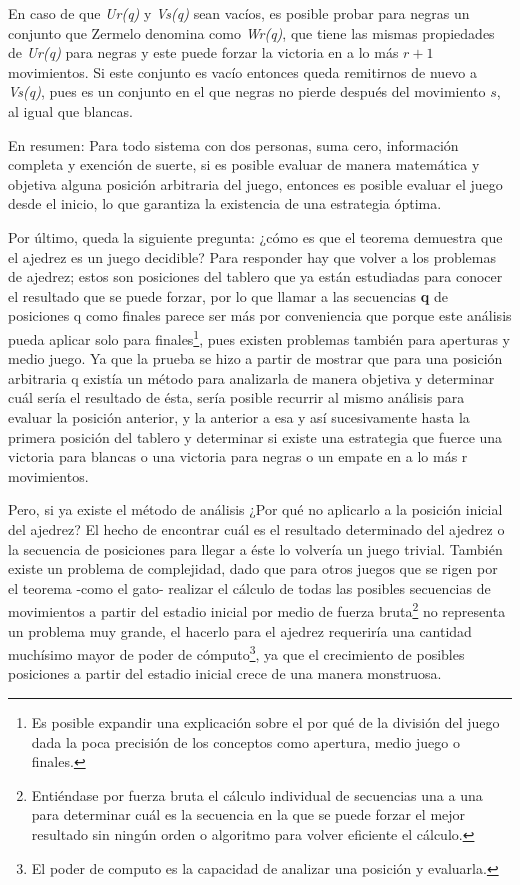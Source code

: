 \documentclass[twoside,openright,12pt,a4paper,spanish]{book}
\begin{document}
En caso de que \emph{Ur(q)} y \emph{Vs(q)} sean vacíos, es posible probar para negras un conjunto que Zermelo denomina como \emph{Wr(q)}, que tiene las mismas propiedades de \emph{Ur(q)} para negras y este puede forzar la victoria en a lo más $r + 1$ movimientos. Si este conjunto es vacío entonces queda remitirnos de nuevo a \emph{Vs(q)}, pues es un conjunto en el que negras no pierde después del movimiento $s$, al igual que blancas.

En resumen: Para todo sistema con dos personas, suma cero, información completa y exención de suerte, si es posible evaluar de manera matemática y objetiva alguna posición arbitraria del juego, entonces es posible evaluar el juego desde el inicio, lo que garantiza la existencia de una estrategia óptima.

Por último, queda la siguiente pregunta: ¿cómo es que el teorema demuestra que el ajedrez es un juego decidible? Para responder hay que volver a los problemas de ajedrez; estos son posiciones del tablero que ya están estudiadas para conocer el resultado que se puede forzar, por lo que llamar a las secuencias \textbf{q} de posiciones q como finales parece ser más por conveniencia que porque este análisis pueda aplicar solo para finales\footnote{Es posible expandir una explicación sobre el por qué de la división del juego dada la poca precisión de los conceptos como apertura, medio juego o finales.}, pues existen problemas también para aperturas y medio juego. Ya que la prueba se hizo a partir de mostrar que para una posición arbitraria q existía un método para analizarla de manera objetiva y determinar cuál sería el resultado de ésta, sería posible recurrir al mismo análisis para evaluar la posición anterior, y la anterior a esa y así sucesivamente hasta la primera posición del tablero y determinar si existe una estrategia que fuerce una victoria para blancas o una victoria para negras o un empate en a lo más r movimientos.

Pero, si ya existe el método de análisis ¿Por qué no aplicarlo a la posición inicial del ajedrez? El hecho de encontrar cuál es el resultado determinado del ajedrez o la secuencia de posiciones para llegar a éste lo volvería un juego trivial. También existe un problema de complejidad, dado que para otros juegos que se rigen por el teorema -como el gato- realizar el cálculo de todas las posibles secuencias de movimientos a partir del estadio inicial por medio de fuerza bruta\footnote{Entiéndase por fuerza bruta el cálculo individual de secuencias una a una para determinar cuál es la secuencia en la que se puede forzar el mejor resultado sin ningún orden o algoritmo para volver eficiente el cálculo.} no representa un problema muy grande, el hacerlo para el ajedrez requeriría una cantidad muchísimo mayor de poder de cómputo\footnote{El poder de computo es la capacidad de analizar una posición y evaluarla.}, ya que el crecimiento de posibles posiciones a partir del estadio inicial crece de una manera monstruosa.
\end{document}
